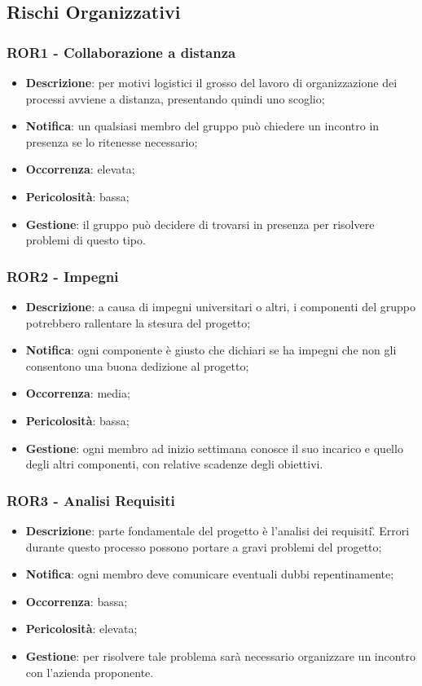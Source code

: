   \subsection{Rischi Organizzativi}

	\subsubsection*{ROR1 - Collaborazione a distanza}
	\begin{itemize}
		\item \textbf{Descrizione}: per motivi logistici il grosso del lavoro di organizzazione dei processi avviene a distanza, presentando quindi uno scoglio;
		\item \textbf{Notifica}: un qualsiasi membro del gruppo può chiedere un incontro in presenza se lo ritenesse necessario;
		\item \textbf{Occorrenza}: elevata;
		\item \textbf{Pericolosità}: bassa;
		\item \textbf{Gestione}: il gruppo può decidere di trovarsi in presenza per risolvere problemi di questo tipo.
	\end{itemize}

	\subsubsection*{ROR2 - Impegni}
	\begin{itemize}
		\item \textbf{Descrizione}: a causa di impegni universitari o altri, i componenti del gruppo potrebbero rallentare la stesura del progetto;
		\item \textbf{Notifica}: ogni componente è giusto che dichiari se ha  impegni che non gli consentono una buona dedizione al progetto;
		\item \textbf{Occorrenza}: media;
		\item \textbf{Pericolosità}: bassa;
		\item \textbf{Gestione}: ogni membro ad inizio settimana conosce il suo incarico e quello degli altri componenti, con relative scadenze degli obiettivi.
	\end{itemize}

	\subsubsection*{ROR3 - Analisi Requisiti}
	\begin{itemize}
		\item \textbf{Descrizione}: parte fondamentale del progetto è l'analisi dei requisiti\G. Errori durante questo processo possono portare a gravi problemi del progetto;
		\item \textbf{Notifica}: ogni membro deve comunicare eventuali dubbi repentinamente;
		\item \textbf{Occorrenza}: bassa;
		\item \textbf{Pericolosità}: elevata;
		\item \textbf{Gestione}: per risolvere tale problema sarà necessario organizzare un incontro con l'azienda proponente.
	\end{itemize}

